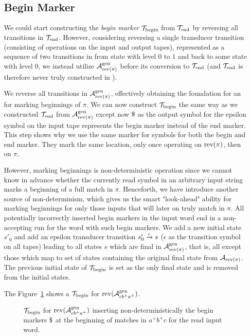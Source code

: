 \subsection{Begin Marker \nft}
We could start constructing the \emph{begin marker} \nft $\mathcal{T}_{\text{begin}}$ from $\mathcal{T}_{\text{end}}$ by reversing all transitions in $\mathcal{T}_{\text{end}}$.
However, considering reversing a single transducer transition (consisting of operations on the input and output tapes), represented as a sequence of two \nfa transitions in \mata from state with level $0$ to $1$ and back to some state with level $0$, we instead utilize $\mathcal{A}^{\text{gen}}_{\text{rev(}\pi\text{)}}$ before its conversion to $\mathcal{T}_{\text{end}}$ (and $\mathcal{T}_{\text{end}}$ is therefore never truly constructed in \mata).

We reverse all transitions in $\mathcal{A}^{\text{gen}}_{\text{rev(}\pi\text{)}}$, effectively obtaining the foundation for an \nfa for marking beginnings of $\pi$.
We can now construct $\mathcal{T}_{\text{begin}}$ the same way as we constructed $\mathcal{T}_{\text{end}}$ from $\mathcal{A}^{\text{gen}}_{\text{rev(}\pi\text{)}}$ except now $\marker$ as the output symbol for the epsilon symbol on the input tape represents the begin marker instead of the end marker.
This step shows why we use the same marker for symbols for both the begin and end marker.
They mark the same location, only once operating on $\text{rev(}\pi\text{)}$, then on $\pi$.

However, marking beginnings is non-deterministic operation since we cannot know in advance whether the currently read symbol in an arbitrary input string marks a beginning of a full match in $\pi$.
Henceforth, we have introduce another source of non-determinism, which gives us the smart "look-ahead" ability for marking beginnings for only those inputs that will later on truly match in $\pi$.
All potentially incorrectly inserted begin markers in the input word end in a non-accepting run for the word with such begin markers.
We add a new initial state $s'_0$ and add an epsilon transducer transition ${s'_0} \xrightarrow{{\epsilon}} {s}$ ($\epsilon$ as the transition symbol on all tapes) leading to all states $s$ which are final in $\mathcal{A}^{\text{gen}}_{\text{rev(}\pi\text{)}}$, that is, all except those which map to set of states containing the original final state from $\mathcal{A}_{\text{rev(}\pi\text{)}}$.
The previous initial state of $\mathcal{T}_{\text{begin}}$ is set as the only final state and is removed from the initial states.

The Figure~\ref{fig:begin_marker_nft} shows a $\mathcal{T}_{\text{begin}}$ for $\text{rev(}\mathcal{A}^{\text{gen}}_{cb^+a^+}\text{)}$.
\begin{figure}[ht]
  \centering
  \caption{\nft $\mathcal{T}_{\text{begin}}$ for $\text{rev(}\mathcal{A}^{\text{gen}}_{cb^+a^+}\text{)}$ inserting non-deterministically the begin markers $\marker$ at the beginning of matches in $a^+b^+c$ for the read input word.}
  \label{fig:begin_marker_nft}
\end{figure}

